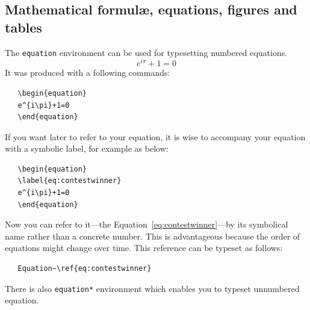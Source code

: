 \documentclass{iitsrc}
\begin{document}
\begin{multicols}{2}
\section{Mathematical formul\ae, equations, figures and tables}
%
The \verb|equation| environment can be used for typesetting numbered
equations.
\begin{equation}
\label{eq:contestwinner}
e^{i\pi}+1=0
\end{equation}
It was produced with a following commands:
\begin{lstlisting}
   \begin{equation}
   e^{i\pi}+1=0
   \end{equation}
\end{lstlisting}
If you want later to refer to your equation, it is wise to accompany
your equation with a symbolic label, for example as below:
\begin{lstlisting}
   \begin{equation}
   \label{eq:contestwinner}
   e^{i\pi}+1=0
   \end{equation}
\end{lstlisting}
Now you can refer to it---the
Equation~\ref{eq:contestwinner}---by its
symbolical name rather than a concrete number. This is advantageous
because the order of equations might change over time. This reference
can be typeset as follows:
\begin{lstlisting}
   Equation~\ref{eq:contestwinner}
\end{lstlisting}
There is also \verb|equation*| environment which enables you to
typeset unnumbered equation.


\end{multicols}
\end{document}
